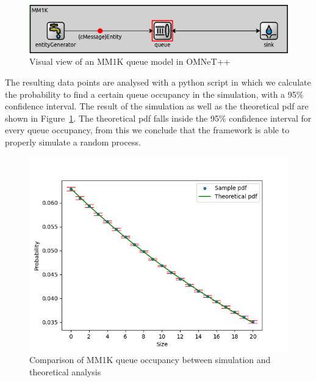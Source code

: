 \begin{figure}[htbp]
    \centering
    \includegraphics[width=\textwidth]{images/MM1K_sim.png}
    \caption{Visual view of an MM1K queue model in OMNeT++}
    \label{fig:mm1k_sim}
\end{figure}

The resulting data points are analysed with a python script in which we calculate the probability to find a certain queue occupancy in the simulation, with a 95\% confidence interval. The result of the simulation as well as the theoretical pdf are shown in Figure~\ref{fig:mm1k_sim}. The theoretical pdf falls inside the 95\% confidence interval for every queue occupancy, from this we conclude that the framework is able to properly simulate a random process.

\begin{figure}[htbp]
    \centering
    \includegraphics[width=\textwidth]{images/MM1k_analysis.png}
    \caption{Comparison of MM1K queue occupancy between simulation and theoretical analysis}
    \label{fig:MM1K_analysis}
\end{figure}


